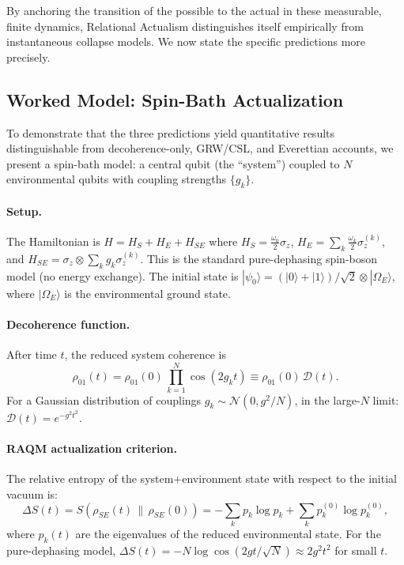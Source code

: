 \documentclass[11pt,a4paper]{article}
\theoremstyle{plain}
\theoremstyle{definition}
\theoremstyle{remark}
\begin{document}
By anchoring the transition of the possible to the actual in these measurable,
finite dynamics, Relational Actualism distinguishes itself empirically from
instantaneous collapse models. We now state the specific predictions more
precisely.


\subsection{Worked Model: Spin-Bath Actualization}
\label{sec:spinbath}

To demonstrate that the three predictions yield quantitative results
distinguishable from decoherence-only, GRW/CSL, and Everettian accounts,
we present a spin-bath model: a central qubit (the ``system'') coupled to
$N$ environmental qubits with coupling strengths $\{g_k\}$.

\paragraph{Setup.}
The Hamiltonian is $H = H_S + H_E + H_{SE}$ where
$H_S = \tfrac{\omega_0}{2}\sigma_z$,
$H_E = \sum_k \tfrac{\omega_k}{2}\sigma_z^{(k)}$, and
$H_{SE} = \sigma_z \otimes \sum_k g_k \sigma_z^{(k)}$.
This is the standard pure-dephasing spin-boson model (no energy exchange).
The initial state is $|\psi_0\rangle = (|0\rangle + |1\rangle)/\sqrt{2}
\otimes |\Omega_E\rangle$, where $|\Omega_E\rangle$ is the environmental
ground state.

\paragraph{Decoherence function.}
After time $t$, the reduced system coherence is
\begin{equation}
  \rho_{01}(t) = \rho_{01}(0)\,\prod_{k=1}^N
  \cos\!\left(2g_k t\right) \equiv \rho_{01}(0)\,\mathcal{D}(t).
  \label{eq:decoherence}
\end{equation}
For a Gaussian distribution of couplings $g_k \sim \mathcal{N}(0,g^2/N)$,
in the large-$N$ limit: $\mathcal{D}(t) = e^{-g^2 t^2}$.

\paragraph{RAQM actualization criterion.}
The relative entropy of the system+environment state with respect to
the initial vacuum is:
\begin{equation}
  \Delta S(t) = S\!\left(\rho_{SE}(t)\,\big\|\,\rho_{SE}(0)\right)
  = -\sum_{k} p_k \log p_k + \sum_k p_k^{(0)}\log p_k^{(0)},
\end{equation}
where $p_k(t)$ are the eigenvalues of the reduced environmental state.
For the pure-dephasing model, $\Delta S(t) = -N\log\cos(2gt/\sqrt{N})
\approx 2g^2 t^2$ for small $t$.
\end{document}
